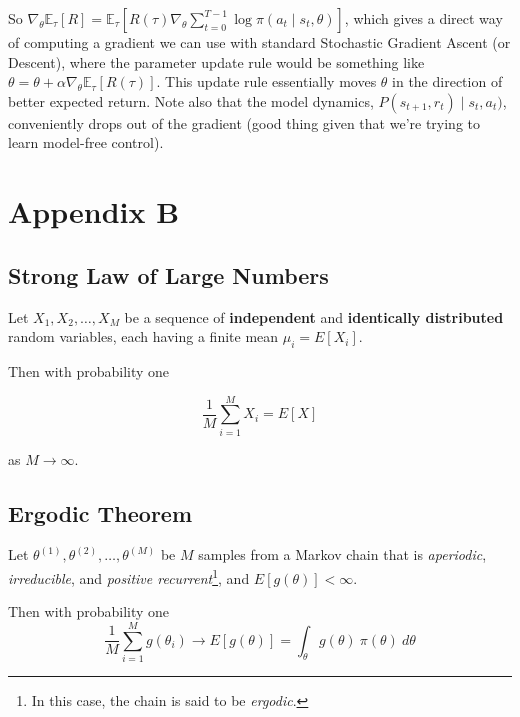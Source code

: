 \documentclass[11pt, oneside]{article}                          %
\begin{document}
\bigskip
{
\noindent
So $\nabla_{\theta} \mathbb{E}_{\tau} [R] = \mathbb{E}_{\tau}
[R(\tau) \nabla_{\theta} \sum\limits_{t = 0}^{T-1} \log{\pi(a_t
\mid s_t,\theta)}]$, which gives a direct way of computing a
gradient we can use with standard Stochastic Gradient Ascent (or
Descent), where the parameter update rule would be something like
$\theta = \theta + \alpha \nabla_{\theta} \mathbb{E}_{\tau}[R(\tau)]$. 
This update rule essentially moves $\theta$ in the direction of 
better expected return. Note also that the model dynamics, 
$P(s_{t+1},r_t) \mid s_t,a_t)$, conveniently drops out of the 
gradient (good thing given that we're trying to learn model-free 
control).
\par}

\section{Appendix B}
\label{appendix:b}

\subsection{Strong Law of Large Numbers}
\label{sec:slln}
Let $X_{1}, X_{2}, \hdots, X_{M}$ be a sequence of 
\textbf{independent} and \textbf{identically distributed} 
random variables, each having a finite mean $\mu_i = E[X_{i}]$. 

\bigskip
\noindent
Then with probability one

\bigskip
\begin{equation*}
\frac{1}{M}\sum\limits_{i=1}^{M} X_i = E[X]
\end{equation*}

\bigskip
\noindent
as  $M \rightarrow \infty$.

\subsection{Ergodic Theorem}
\label{sec:ergodic}
Let $\theta^{(1)}, \theta^{(2)}, \hdots, \theta^{(M)}$ be $M$
samples from a Markov chain that is \emph{aperiodic},
\emph{irreducible}, and \emph{positive recurrent}\footnote{In
this case, the chain is said to be \emph{ergodic}.}, and
$E[g(\theta)] < \infty$.

\bigskip
\noindent
Then with probability one
\bigskip
\begin{equation*}
\frac{1}{M}\sum\limits_{i = 1}^{M} g(\theta_{i}) \rightarrow
E[g(\theta)]  = \int_{\theta}^{}g(\theta) \: \pi(\theta)
\:d\theta 
\end{equation*}
\end{document}
